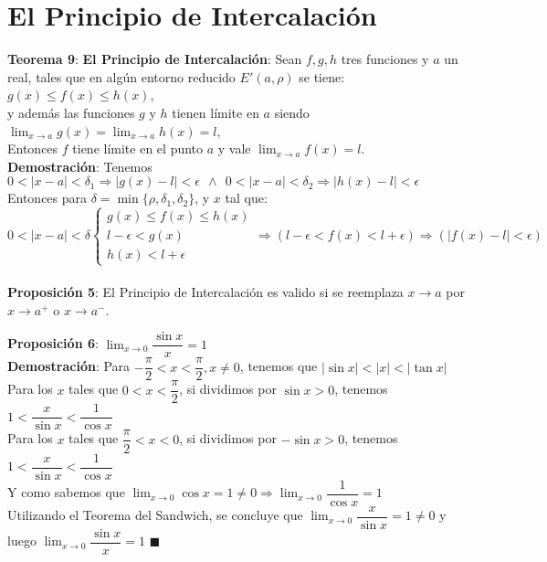 \documentclass[11pt,a4paper]{article}
\newcommand*{\QEDA}{\null\nobreak\hfill\ensuremath{\blacksquare}}
\begin{document}
\section{El Principio de Intercalaci\'on}
\noindent \textbf{Teorema 9}: \textbf{El Principio de Intercalaci\'on}: Sean $f,g,h$ tres funciones y $a$ un real, tales que en alg\'un entorno reducido $E'(a, \rho)$ se tiene: $g(x) \leq f(x) \leq h(x)$,\\
y adem\'as las funciones $g$ y $h$ tienen l\'imite en $a$ siendo $\displaystyle{\lim_{x\to a} g(x) = \lim_{x\to a} h(x) = l}$,\\
Entonces $f$ tiene l\'imite en el punto $a$ y vale $\displaystyle{\lim_{x\to a} f(x)=l}.$\\
\noindent \textbf{Demostraci\'on}: Tenemos $0<|x-a|<\delta_1 \Rightarrow|g(x)-l| < \epsilon \ \ \land \ \ 0<|x-a|<\delta_2 \Rightarrow |h(x) - l| < \epsilon$\\
Entonces para $\delta = \min\{\rho, \delta_1, \delta_2\}$, y $x$ tal que:
\[0 < |x-a| < \delta \left\{\begin{array}{l}
g(x) \leq f(x) \leq h(x)\\
l - \epsilon < g(x)\\
h(x) < l + \epsilon
\end{array}\right. \Rightarrow (l - \epsilon < f(x) < l + \epsilon) \Rightarrow (|f(x) - l| < \epsilon)\]\\

\noindent \textbf{Proposici\'on 5}: El Principio de Intercalaci\'on es valido si se reemplaza $x\rightarrow a$ por $x\rightarrow a^+$ o $x\rightarrow a^-$.

\noindent \textbf{Proposici\'on 6}: $\displaystyle{\lim_{x \to 0} \dfrac{\sin x}{x} = 1}$\\
\noindent \textbf{Demostraci\'on}: Para $-\dfrac{\pi}{2} < x < \dfrac{\pi}{2}, x \not = 0$, tenemos que $|\sin x| < |x| < |\tan x|$\\
Para los $x$ tales que $0 < x < \dfrac{\pi}{2}$, si dividimos por $\sin x > 0$, tenemos $1 < \dfrac{x}{\sin x} < \dfrac{1}{\cos x}$\\
Para los $x$ tales que $\dfrac{\pi}{2} < x < 0$, si dividimos por $-\sin x > 0$, tenemos $1 < \dfrac{x}{\sin x} < \dfrac{1}{\cos x}$\\
Y como sabemos que $\displaystyle{\lim_{x \to 0} \cos x = 1} \not = 0 \Rightarrow \displaystyle{\lim_{x \to 0} \dfrac{1}{\cos x} = 1}$\\
Utilizando el Teorema del Sandwich, se concluye que $\displaystyle{\lim_{x \to 0} \dfrac{x}{\sin x} = 1 \not = 0}$ y luego $\displaystyle{\lim_{x \to 0} \dfrac{\sin x}{x} = 1}$
\QEDA\\
\end{document}
